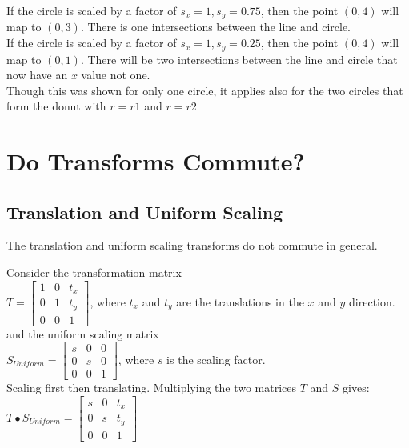 \documentclass[a4paper,10pt]{scrartcl}
\begin{document}
If the circle is scaled by a factor of $s_x = 1, s_y = 0.75$, then the point $(0,4)$ will map to $(0, 3)$. There is one intersections between the line and circle.\\

If the circle is scaled by a factor of $s_x = 1, s_y = 0.25$, then the point $(0,4)$ will map to $(0, 1)$. There will be two intersections between the line and circle that now have an $x$ value not one.\\

Though this was shown for only one circle, it applies also for the two circles that form the donut with $r = r1$ and $r = r2$



\section{Do Transforms Commute?}

\subsection{Translation and Uniform Scaling}

The translation and uniform scaling transforms do not commute in general.

Consider the transformation matrix \\

$T = 
\begin{bmatrix}
    1       & 0 & t_x \\
    0       & 1 & t_y \\
    0       & 0 & 1 
\end{bmatrix}
$, where $t_x $ and $t_y$ are the translations in the $x$ and $y$ direction. \\

and the uniform scaling matrix \\

$S_{Uniform} = \begin{bmatrix}
    s       & 0 & 0 \\
    0       & s & 0 \\
    0       & 0 & 1     
 \end{bmatrix}
$, where $s$ is the scaling factor. \\

Scaling first then translating. Multiplying the two matrices $T$ and $S$ gives: \\

$T \bullet S_{Uniform} = \begin{bmatrix}
		  s & 0 & t_x \\
		  0 & s & t_y \\
		  0 & 0 & 1
               \end{bmatrix}
$ \\
\end{document}
